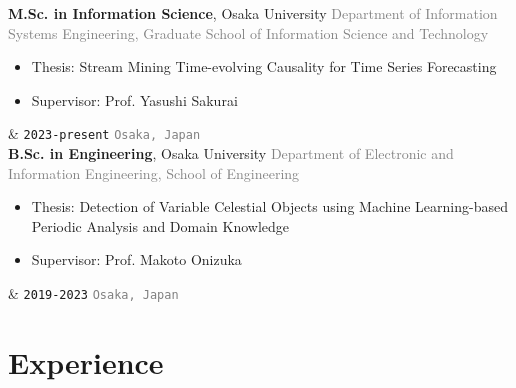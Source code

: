 \documentclass[9pt,a4paper]{article}
\newcommand{\OU}{Osaka University}
\newcommand{\Duration}[2]{\fontsize{10pt}{0}\selectfont \texttt{#1-#2}}
\newcommand{\Ongoing}{present}
\begin{document}
\begin{EntriesTableRight}
  \textbf{M.Sc. in Information Science}, \OU
  \vspace{-0.1em}
  \newline
  \textcolor{gray}{{\fontsize{9pt}{0}\selectfont Department of Information Systems Engineering, Graduate School of Information Science and Technology}}
  \vspace{-0.1em}
  \newline
  {\setlength{\leftmargini}{17.2pt}
  \begin{itemize}
  \vspace{-1.0em}
      \item Thesis: Stream Mining Time-evolving Causality for Time Series Forecasting
      \item Supervisor: Prof. Yasushi Sakurai
  \vspace{-1.3em}
  \end{itemize}}
  &
  \hfill
  \Duration{2023}{\Ongoing}
  \vspace{0.3em}
  \newline
  \hfill
  \textcolor{gray}{\fontsize{9pt}{0}\selectfont \texttt{Osaka, \!\!Japan}~}
  \\[4.45em]
  \textbf{B.Sc. in Engineering}, \OU
  \vspace{-0.1em}
  \newline
  \textcolor{gray}{{\fontsize{9pt}{0}\selectfont Department of Electronic and Information Engineering, School of Engineering}}
  \vspace{-0.1em}
  \newline
  {\setlength{\leftmargini}{17.2pt}
  \begin{itemize}
  \vspace{-1.0em}
      \item Thesis: Detection of Variable Celestial Objects using Machine Learning-based Periodic Analysis and Domain Knowledge
      \item Supervisor: Prof. Makoto Onizuka
  \vspace{-1.3em}
  \end{itemize}}
  &
  \hfill
  \Duration{2019}{2023}
  \vspace{0.5em}
  \newline
  \hfill
  \textcolor{gray}{\fontsize{9pt}{0}\selectfont \texttt{Osaka, \!\!Japan}~}
\end{EntriesTableRight}

\section{Experience}
\end{document}

